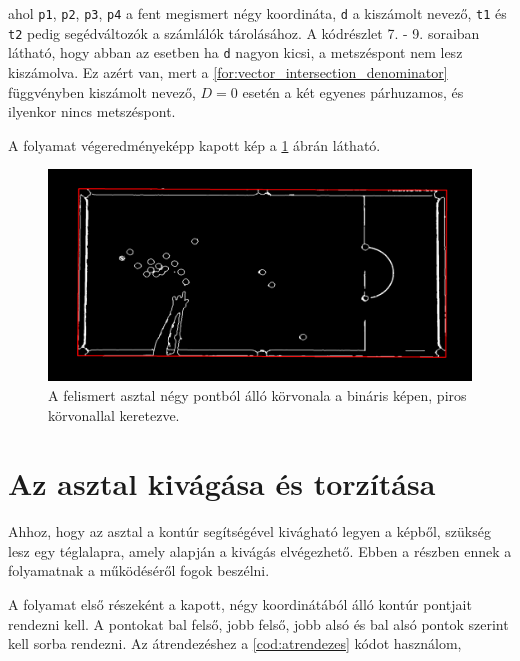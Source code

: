 \par ahol \lstinline{p1}, \lstinline{p2}, \lstinline{p3}, \lstinline{p4} a fent megismert négy koordináta, \lstinline{d} a kiszámolt nevező, \lstinline{t1} és \lstinline{t2} pedig segédváltozók a számlálók tárolásához. A kódrészlet 7. - 9. soraiban látható, hogy abban az esetben ha \lstinline{d} nagyon kicsi, a metszéspont nem lesz kiszámolva. Ez azért van, mert a \ref{for:vector_intersection_denominator} függvényben kiszámolt nevező, $D = 0$ esetén a két egyenes párhuzamos, és ilyenkor nincs metszéspont.
\par A folyamat végeredményeképp kapott kép a \ref{fig:bemeneti_kep_quad} ábrán látható.

\begin{figure}[!ht]
    \centering
    \includegraphics[width=140mm, keepaspectratio]{figures/input_screen_quad.png}
    \caption{A felismert asztal négy pontból álló körvonala a bináris képen, piros körvonallal keretezve.}
    \label{fig:bemeneti_kep_quad}
\end{figure}

\section{Az asztal kivágása és torzítása}
Ahhoz, hogy az asztal a kontúr segítségével kivágható legyen a képből, szükség lesz egy téglalapra, amely alapján a kivágás elvégezhető. Ebben a részben ennek a folyamatnak a működéséről fogok beszélni.
\par A folyamat első részeként a kapott, négy koordinátából álló kontúr pontjait rendezni kell. A pontokat bal felső, jobb felső, jobb alsó és bal alsó pontok szerint kell sorba rendezni.
\newline Az átrendezéshez a \ref{cod:atrendezes} kódot használom,

